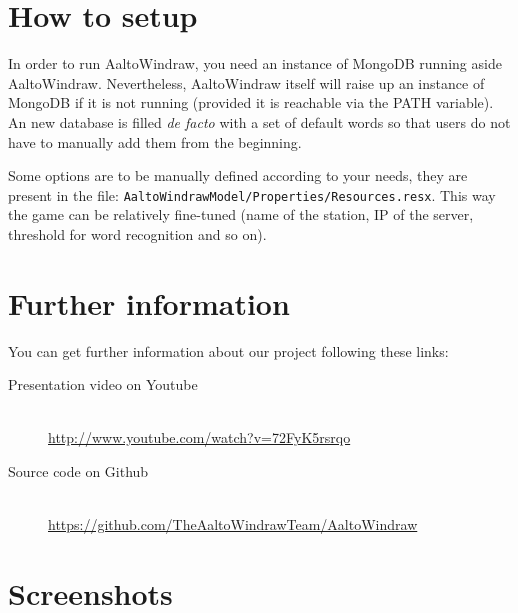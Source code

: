 \documentclass[a4paper,12pt]{article}
\begin{document}
\section*{How to setup}
In order to run AaltoWindraw, you need an instance of MongoDB running aside AaltoWindraw. Nevertheless, AaltoWindraw itself will raise up an instance of MongoDB if it is not running (provided it is reachable via the PATH variable). An new database is filled \emph{de facto} with a set of default words so that users do not have to manually add them from the beginning.

Some options are to be manually defined according to your needs, they are present in the file: \verb$AaltoWindrawModel/Properties/Resources.resx$. This way the game can be relatively fine-tuned (name of the station, IP of the server, threshold for word recognition and so on).


\section*{Further information}
You can get further information about our project following these links:
\begin{description}
\item[Presentation video on Youtube] \hfill \\ \href{http://www.youtube.com/watch?v=72FyK5rsrqo}{http://www.youtube.com/watch?v=72FyK5rsrqo}
\item[Source code on Github] \hfill \\ \href{https://github.com/TheAaltoWindrawTeam/AaltoWindraw}{https://github.com/TheAaltoWindrawTeam/AaltoWindraw}
\end{description}

\section*{Screenshots}
\end{document}
